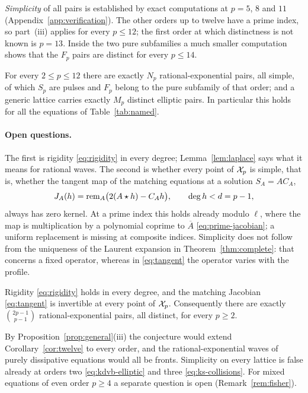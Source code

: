 \emph{Simplicity} of all pairs is established by exact computations at
\(p=5\), \(8\) and \(11\) (Appendix~\ref{app:verification}). The other
orders up to twelve have a prime index, so part~(iii) applies for every
\(p\le12\); the first order at which distinctness is not known is
\(p=13\). Inside the two pure subfamilies a much smaller computation
shows that the \(F_p\) pairs are distinct for every \(p\le14\).

\begin{corollary}\label{cor:twelve}
For every \(2\le p\le12\) there are exactly \(N_p\) rational-exponential
pairs, all simple, of which \(S_p\) are pulses and \(F_p\) belong to
the pure subfamily of that order; and a generic lattice carries exactly
\(M_p\) distinct elliptic pairs. In particular this holds for all the
equations of Table~\ref{tab:named}.
\end{corollary}

\paragraph{Open questions.}\label{sec:open}
The first is rigidity \eqref{eq:rigidity} in every degree;
Lemma~\ref{lem:laplace} says what it means for rational waves. The
second is whether every point of \(\mathcal X_p\) is simple, that is, whether the
tangent map of the matching equations at a solution \(S_A=AC_A\),
\begin{equation}\label{eq:tangent}
 J_A(h)=\operatorname{rem}_{A}\bigl(2(A\star h)-C_Ah\bigr),\qquad \deg h<d=p-1,
\end{equation}
always has zero kernel. At a prime index this holds already modulo
\(\ell\), where the map is multiplication by a polynomial coprime to
\(\overline A\) \eqref{eq:prime-jacobian}; a uniform replacement is
missing at composite indices. Simplicity does not follow from the
uniqueness of the Laurent expansion in Theorem~\ref{thm:complete}: that
concerns a fixed operator, whereas in \eqref{eq:tangent} the operator
varies with the profile.

\begin{conjecture}\label{conj:count}
Rigidity \eqref{eq:rigidity} holds in every degree, and the matching
Jacobian \eqref{eq:tangent} is invertible at every point of \(\mathcal X_p\).
Consequently there are exactly \(\binom{2p-1}{p-1}\)
rational-exponential pairs, all distinct, for every \(p\ge2\).
\end{conjecture}

By Proposition~\ref{prop:general}(iii) the conjecture would extend
Corollary~\ref{cor:twelve} to every order, and the rational-exponential
waves of purely dissipative equations would all be fronts. Simplicity on
every lattice is false already at orders two \eqref{eq:kdvb-elliptic}
and three \eqref{eq:ks-collisions}. For mixed equations of even order
\(p\ge4\) a separate question is open (Remark~\ref{rem:fisher}).
